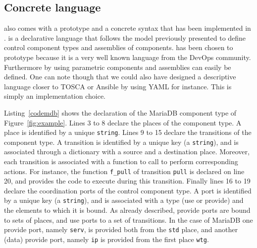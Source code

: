 
\subsection{Concrete language}

\mad also comes with a prototype and a concrete syntax that has been implemented in \python. \mad is a declarative language that follows the model previously presented to define control component types and assemblies of components. \python has been chosen to prototype \mad because it is a very well known language from the DevOps community. Furthermore by using \python parametric components and assemblies can easily be defined. One can note though that we could also have designed a descriptive language closer to TOSCA or Ansible by using YAML for instance. This is simply an implementation choice. 

Listing~\ref{codemdb} shows the declaration of the MariaDB component type of Figure~\ref{fig:example}. Lines 3 to 8 declare the places of the component type. A place is identified by a unique \texttt{string}. Lines 9 to 15 declare the transitions of the component type. A transition is identified by a unique key (a \texttt{string}), and is associated through a dictionary with a source and a destination place. Moreover, each transition is associated with a function to call to perform corresponding actions. For instance, the function \texttt{f\_pull} of transition \texttt{pull} is declared on line 20, and provides the code to execute during this transition. Finally lines 16 to 19 declare the coordination ports of the control component type. A port is identified by a unique key (a \texttt{string}), and is associated with a type (use or provide) and the elements to which it is bound. As already described, provide ports are bound to sets of places, and use ports to a set of transitions. In the case of MariaDB one provide port, namely \texttt{serv}, is provided both from the \texttt{std} place, and another (data) provide port, namely \texttt{ip} is provided from the first place \texttt{wtg}.

